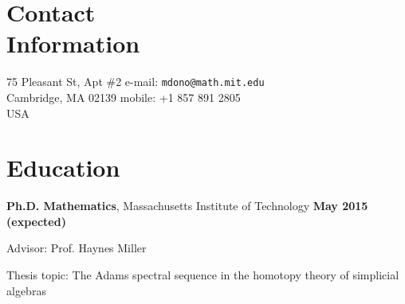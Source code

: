 \documentclass[margin,line]{resume}
\begin{document}
\begin{resume}

\vspace{4mm}
    \section{\mysidestyle Contact\\Information}

    75 Pleasant St, Apt \#2                 \hfill e-mail: \texttt{mdono@math.mit.edu}                 
\vspace{0mm}\\\vspace{0mm}%
    Cambridge, MA  02139                    \hfill mobile: +1 857 891 2805 \vspace{0mm}\\\hspace{-1mm} 				
    USA                                  





    \section{\mysidestyle Education}

 \textbf{Ph.D. Mathematics}, Massachusetts Institute of Technology
\hfill \textbf{May 2015  (expected)}\\%

\vspace{-3mm}
    \begin{list2}
        \item Advisor: Prof. Haynes Miller
        \item Thesis topic: The Adams spectral sequence in the homotopy theory of simplicial algebras
    \end{list2}
    

\end{resume}
\end{document}
